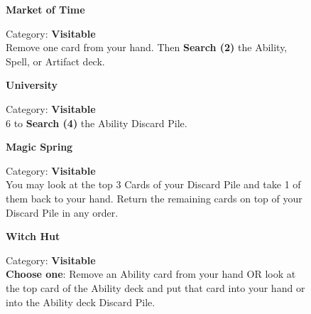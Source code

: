 \begin{figure}[H]
  \begin{minipage}[t]{0.47\textwidth}
    \vspace{0pt}
    \centering
    \phantom{j}\textbf{Market of Time}\par
    \caption{\small Category: \textbf{Visitable}\\ Remove one card from your hand.
Then \textbf{Search (2)} the Ability, Spell, or Artifact deck.}
  \end{minipage}\hfill
  \begin{minipage}[t]{0.47\textwidth}
    \vspace{0pt}
    \centering
    \textbf{University}\par
    \caption{\small Category: \textbf{Visitable}\\
       6  to \textbf{Search (4)} the Ability Discard Pile.}
  \end{minipage}
\end{figure}

\begin{figure}[H]
  \begin{minipage}[t]{0.47\textwidth}
    \vspace{0pt}
    \centering
    \textbf{Magic Spring}\par
    \caption{\small Category: \textbf{Visitable}\\
      You may look at the top 3 Cards of your Discard Pile and take 1 of them back to your hand.
      Return the remaining cards on top of your Discard Pile in any order.}
  \end{minipage}\hfill
  \begin{minipage}[t]{0.47\textwidth}
    \vspace{0pt}
    \centering
    \phantom{j}\textbf{Witch Hut}\par
    \caption{\small Category: \textbf{Visitable}\\
      \textbf{Choose one}: Remove an Ability card from your hand OR look at the top card of the Ability deck and put that card into your hand or into the Ability deck Discard Pile.}
  \end{minipage}
\end{figure}


